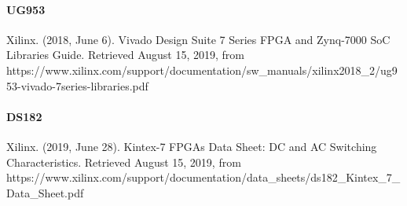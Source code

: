 \documentclass[11pt]{article}
\begin{document}
\paragraph{UG953}Xilinx. (2018, June 6). Vivado Design Suite 7 Series FPGA and Zynq-7000 SoC Libraries Guide. Retrieved August 15, 2019,
from https://www.xilinx.com/support/documentation/sw\_manuals/xilinx2018\_2/ug953-vivado-7series-libraries.pdf
\paragraph{DS182}Xilinx. (2019, June 28). Kintex-7 FPGAs Data Sheet: DC and AC Switching Characteristics. Retrieved August 15, 2019, from\break
https://www.xilinx.com/support/documentation/data\_sheets/ds182\break\_Kintex\_7\_Data\_Sheet.pdf
\end{document}
